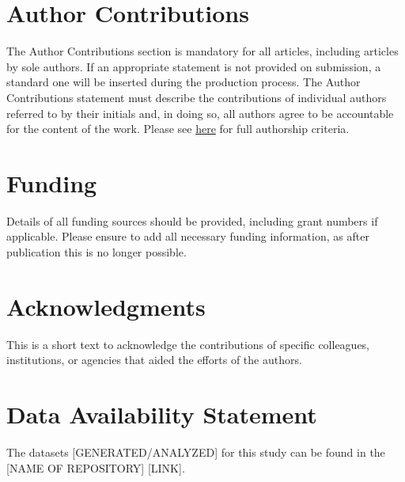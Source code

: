 \documentclass[utf8]{frontiersFPHY} %
\begin{document}
\section*{Author Contributions}

The Author Contributions section is mandatory for all articles, including articles by sole authors. If an appropriate statement is not provided on submission, a standard one will be inserted during the production process. The Author Contributions statement must describe the contributions of individual authors referred to by their initials and, in doing so, all authors agree to be accountable for the content of the work. Please see  \href{http://home.frontiersin.org/about/author-guidelines#AuthorandContributors}{here} for full authorship criteria.

\section*{Funding}
Details of all funding sources should be provided, including grant numbers if applicable. Please ensure to add all necessary funding information, as after publication this is no longer possible.

\section*{Acknowledgments}
This is a short text to acknowledge the contributions of specific colleagues, institutions, or agencies that aided the efforts of the authors.


\section*{Data Availability Statement}
The datasets [GENERATED/ANALYZED] for this study can be found in the [NAME OF REPOSITORY] [LINK].

%


\end{document}
